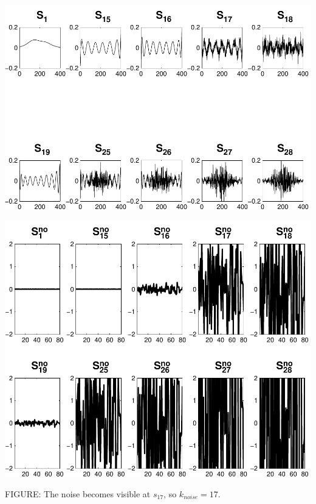 \documentclass[11pt]{amsart}
\begin{document}
	\vspace{5mm}
	\begin{minipage}[t]{0.5\textwidth}
	
		\includegraphics[width=.95\linewidth]{figures/run1/sk_plots} 
   
	\end{minipage}
	\begin{minipage}[t]{0.5\textwidth}
	
		\includegraphics[width=.75\linewidth]{figures/run1/noise_parts} 
   
	\end{minipage}
	\begin{center}
		FIGURE: 
		The noise becomes visible at $s_{17}$, so $k_{noise} = 17$.
	\end{center} 
	\vspace{5mm}

	
	
\end{document}
